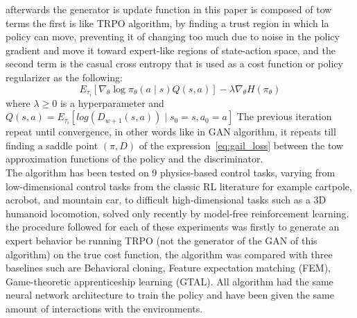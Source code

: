 afterwards the generator is update function in this paper is composed of tow terms the first is like TRPO algorithm, by finding a trust region in which la policy can move, preventing it of changing too much due to noise in the policy gradient and move it toward expert-like regions of state-action space, and the second term is the casual cross entropy that is used as a cost function or policy regularizer as the following:
\begin{equation}
E_{\tau_i}[\nabla_{\theta}\log{\pi_{\theta}(a \mid s)}Q(s,a)] - \lambda \nabla_{\theta} H(\pi_{\theta})
\label{eq:gail_loss}
\end{equation}
where $\lambda \geqslant 0$ is a hyperparameter and $Q(s,a) = E_{\tau_i}[log{(D_{w+1}(s,a))} \mid s_0=s,a_0 = a]$
The previous iteration repeat until convergence, in other words like in GAN algorithm, it repeats till finding a saddle point $(\pi, D)$ of the expression~\ref{eq:gail_loss} between the tow approximation functions of the policy and the discriminator.\\
The algorithm has been tested on 9 physics-based control tasks, varying from low-dimensional control tasks from the classic RL literature for example cartpole, acrobot, and mountain
car, to difficult high-dimensional tasks such as a 3D humanoid locomotion, solved only recently
by model-free reinforcement learning. the procedure followed for each of these experiments was firstly to generate an expert behavior be running TRPO (not the generator of the GAN of this algorithm) on the true cost function, the algorithm was compared with three baselines such are Behavioral cloning, Feature expectation matching (FEM), Game-theoretic apprenticeship learning (GTAL). All algorithm had the same neural network architecture to train the policy and have been given the same amount of interactions with the environments.

